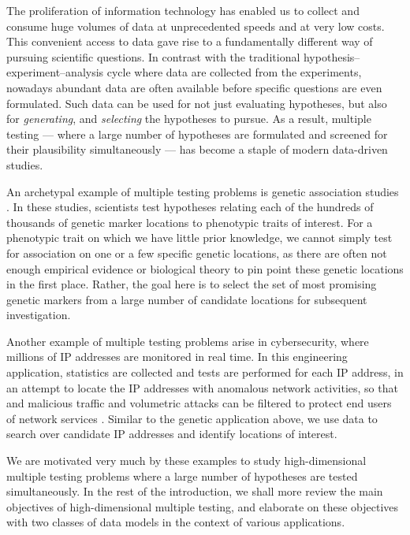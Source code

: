 The proliferation of information technology has enabled us to collect and consume huge volumes of data at unprecedented speeds and at very low costs.
This convenient access to data gave rise to a fundamentally different way of pursuing scientific questions.
In contrast with the traditional hypothesis--experiment--analysis cycle where data are collected from the experiments, nowadays abundant data are often available before specific questions are even formulated. 
Such data can be used for not just evaluating hypotheses, but also for \emph{generating}, and \emph{selecting} the hypotheses to pursue. 
As a result, {multiple testing} --- where a large number of hypotheses are formulated and screened for their plausibility simultaneously --- has become a staple of modern data-driven studies.

An archetypal example of multiple testing problems is genetic association studies \citep{bush2012genome}.
In these studies, scientists test hypotheses relating each of the hundreds of thousands of genetic marker locations to phenotypic traits of interest.
For a phenotypic trait on which we have little prior knowledge, we cannot simply test for association on one or a few specific genetic locations, as there are often not enough empirical evidence or biological theory to pin point these genetic locations in the first place.
Rather, the goal here is to select the set of most promising genetic markers from a large number of candidate locations for subsequent investigation.

Another example of multiple testing problems arise in cybersecurity, where millions of IP addresses are monitored in real time.
In this engineering application, statistics are collected and tests are performed for each IP address, in an attempt to locate the IP addresses with anomalous network activities, so that and malicious traffic and volumetric attacks can be filtered to protect end users of network services \citep{kallitsis2016amon}.
Similar to the genetic application above, we use data to search over candidate IP addresses and identify locations of interest.

We are motivated very much by these examples to study {high-dimensional} multiple testing problems where a large number of hypotheses are tested simultaneously.
In the rest of the introduction, we shall more review the main objectives of high-dimensional multiple testing, and elaborate on these objectives with two classes of data models in the context of various applications.

